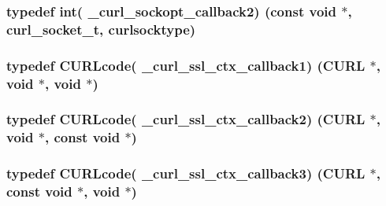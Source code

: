 \subsubsection[{\texorpdfstring{\+\_\+curl\+\_\+sockopt\+\_\+callback2}{_curl_sockopt_callback2}}]{\setlength{\rightskip}{0pt plus 5cm}typedef int( \+\_\+curl\+\_\+sockopt\+\_\+callback2) (const void $\ast$, {\bf curl\+\_\+socket\+\_\+t}, {\bf curlsocktype})}\hypertarget{typecheck-gcc_8h_ababbf83b9d0907aa6938998a4bf0b6b8}{}\label{typecheck-gcc_8h_ababbf83b9d0907aa6938998a4bf0b6b8}
\subsubsection[{\texorpdfstring{\+\_\+curl\+\_\+ssl\+\_\+ctx\+\_\+callback1}{_curl_ssl_ctx_callback1}}]{\setlength{\rightskip}{0pt plus 5cm}typedef {\bf C\+U\+R\+Lcode}( \+\_\+curl\+\_\+ssl\+\_\+ctx\+\_\+callback1) ({\bf C\+U\+RL} $\ast$, void $\ast$, void $\ast$)}\hypertarget{typecheck-gcc_8h_a05c55b1e4b35247bffa0fbe08d41ad38}{}\label{typecheck-gcc_8h_a05c55b1e4b35247bffa0fbe08d41ad38}
\subsubsection[{\texorpdfstring{\+\_\+curl\+\_\+ssl\+\_\+ctx\+\_\+callback2}{_curl_ssl_ctx_callback2}}]{\setlength{\rightskip}{0pt plus 5cm}typedef {\bf C\+U\+R\+Lcode}( \+\_\+curl\+\_\+ssl\+\_\+ctx\+\_\+callback2) ({\bf C\+U\+RL} $\ast$, void $\ast$, const void $\ast$)}\hypertarget{typecheck-gcc_8h_adc0ea99771e27458c834d1d6f8bdcc22}{}\label{typecheck-gcc_8h_adc0ea99771e27458c834d1d6f8bdcc22}
\subsubsection[{\texorpdfstring{\+\_\+curl\+\_\+ssl\+\_\+ctx\+\_\+callback3}{_curl_ssl_ctx_callback3}}]{\setlength{\rightskip}{0pt plus 5cm}typedef {\bf C\+U\+R\+Lcode}( \+\_\+curl\+\_\+ssl\+\_\+ctx\+\_\+callback3) ({\bf C\+U\+RL} $\ast$, const void $\ast$, void $\ast$)}\hypertarget{typecheck-gcc_8h_aa175d06eb00c16e50b97f65abe59d620}{}\label{typecheck-gcc_8h_aa175d06eb00c16e50b97f65abe59d620}
